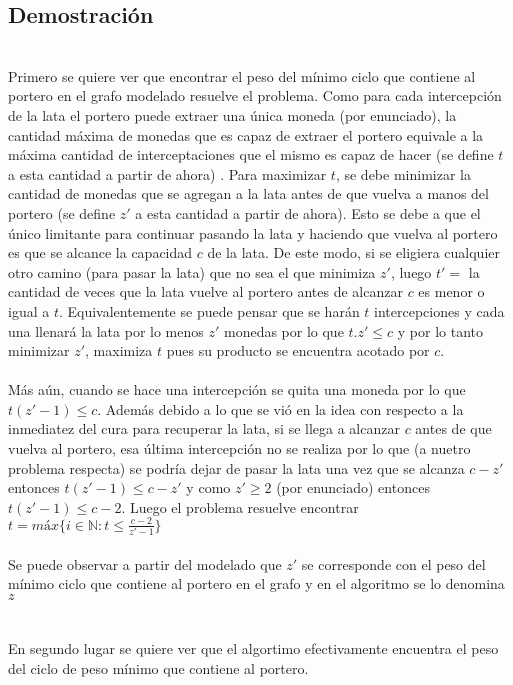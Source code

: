 \documentclass[a4paper]{article}
\begin{document}
\subsection{Demostración}

\\
Primero se quiere ver que encontrar el peso del mínimo ciclo que contiene al portero en el grafo modelado resuelve el problema. Como para cada intercepción de la lata el portero puede extraer una única moneda (por enunciado), la cantidad máxima de monedas que es capaz de extraer el portero equivale a la máxima cantidad de interceptaciones que el mismo es capaz de hacer (se define $t$ a esta cantidad a partir de ahora) . Para maximizar $t$, se debe minimizar la cantidad de monedas que se agregan a la lata antes de que vuelva a manos del portero (se define $z'$ a esta cantidad a partir de ahora). Esto se debe a que el único limitante para continuar pasando la lata y haciendo que vuelva al portero es que se alcance la capacidad $c$ de la lata. De este modo, si se eligiera cualquier otro camino (para pasar la lata) que no sea el que minimiza $z'$, luego $t' =$ la cantidad de veces que la lata vuelve al portero antes de alcanzar $c$ es menor o igual a $t$. Equivalentemente se puede pensar que se harán $t$ intercepciones y cada una llenará la lata por lo menos $z'$ monedas por lo que  $t.z' \leq c$ y por lo tanto minimizar $z'$, maximiza $t$ pues su producto se encuentra acotado por $c$.
\\

\\
Más aún, cuando se hace una intercepción se quita una moneda por lo que $t(z'-1) \leq c$.
Además debido a lo que se vió en la idea con respecto a la inmediatez del cura para recuperar la lata, si se llega a alcanzar $c$ antes de que vuelva al portero, esa última intercepción no se realiza por lo que (a nuetro problema respecta) se podría dejar de pasar la lata una vez que se alcanza $c-z'$ entonces $t(z'-1) \leq c-z'$ y como $z' \geq 2$ (por enunciado) entonces $t(z'-1) \leq c - 2$. Luego el problema resuelve encontrar $t = máx \{ i \in \mathbb{N} : t \leq \frac{c-2}{z'-1} \} $ 
\\

\\
Se puede observar a partir del modelado que $z'$ se corresponde con el peso del mínimo ciclo que contiene al portero en el grafo y en el algoritmo se lo denomina $z$
\\
\\
\\
En segundo lugar se quiere ver que el algortimo efectivamente encuentra el peso del ciclo de peso mínimo que contiene al portero.
\end{document}
